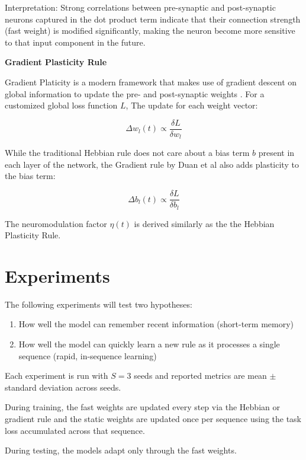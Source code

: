 \documentclass{article}
\begin{document}
\noindent
Interpretation: Strong correlations between pre-synaptic and post-synaptic neurons captured in the dot product term indicate that their connection strength (fast weight) is modified significantly, making the neuron become more sensitive to that input component in the future. \vspace{10pt}

\noindent
\textbf{Gradient Plasticity Rule}\vspace{5pt}

\noindent
Gradient Platicity is a modern framework that makes use of gradient descent on global information to update the pre- and post-synaptic weights \cite{duan2023hebbiangradientbasedplasticityenables}. For a customized global loss function $L$,
\noindent
The update for each weight vector:

$$\Delta w_l(t) \propto \frac{\delta L}{\delta w_l}$$
\noindent

While the traditional Hebbian rule does not care about a bias term $b$ present in each layer of the network, the Gradient rule by Duan et al also adds plasticity to the bias term:

$$\Delta b_l(t) \propto \frac{\delta L}{\delta b_l}$$
\noindent

The neuromodulation factor $\eta(t)$ is derived similarly as the the Hebbian Plasticity Rule.


\section{Experiments}

The following experiments will test two hypotheses: 
\begin{enumerate}
    \item How well the model can remember recent information (short-term memory)
    \item How well the model can quickly learn a new rule as it processes a single sequence (rapid, in-sequence learning)
\end{enumerate}
\vspace{10pt}

Each experiment is run with $S=3$ seeds and reported metrics are mean $\pm$ standard deviation across seeds. 

During training, the fast weights are updated every step via the Hebbian or gradient rule and the static weights are updated once per sequence using the task loss accumulated across that sequence.

During testing, the models adapt only through the fast weights.
\end{document}
